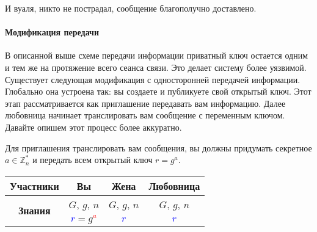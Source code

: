 И вуаля, никто не пострадал, сообщение благополучно доставлено.

\paragraph{Модификация передачи}

В описанной выше схеме передачи информации приватный ключ остается одним и тем же на протяжение всего сеанса связи.
Это делает систему более уязвимой.
Существует следующая модификация с односторонней передачей информации.
Глобально она устроена так: вы создаете и публикуете свой открытый ключ.
Этот этап рассматривается как приглашение передавать вам информацию.
Далее любовница начинает транслировать вам сообщение с переменным ключом.
Давайте опишем этот процесс более аккуратно.

Для приглашения транслировать вам сообщения, вы должны придумать секретное $a\in \mathbb Z_n^*$ и передать всем открытый ключ $r = g^a$.
\begin{center}
\begin{tabular}{|c|c|c|c|}
\hline
{\bf Участники}&{Вы}&{Жена}&{Любовница}\\
\hline
\multirow{2}{*}{\bf Знания}&{\textcolor{OliveGreen}{$G$}, \textcolor{OliveGreen}{$g$}, \textcolor{OliveGreen}{$n$}}&{\textcolor{OliveGreen}{$G$}, \textcolor{OliveGreen}{$g$}, \textcolor{OliveGreen}{$n$}}&{\textcolor{OliveGreen}{$G$}, \textcolor{OliveGreen}{$g$}, \textcolor{OliveGreen}{$n$}}\\
{}&{ \textcolor{blue}{$r$}$=$\textcolor{OliveGreen}{$ g$}\textcolor{red}{${}^a$}}&{\textcolor{blue}{$r$}}&{\textcolor{blue}{$r$}}\\
\hline
\end{tabular}
\end{center}

